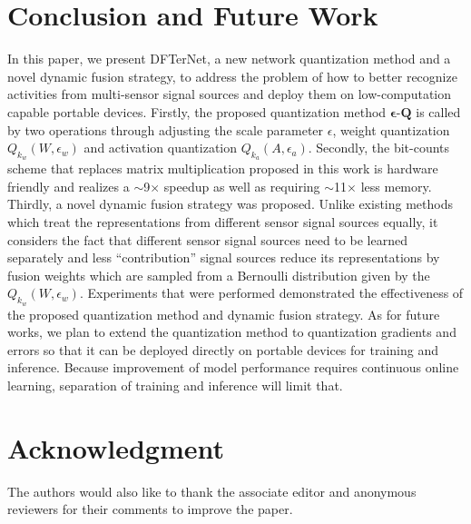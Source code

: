 \documentclass[twoside,twocolumn]{article}
\begin{document}
\section{Conclusion and Future Work}\label{sec:Conclusion_and_Future_Work}
In this paper, we present DFTerNet, a new network quantization method and a novel dynamic fusion strategy, to address the problem of how to better recognize activities from multi-sensor signal sources and deploy them on low-computation capable portable devices. Firstly, the proposed quantization method $\boldsymbol{\epsilon }$-$\boldsymbol{Q}$ is called by two operations through adjusting the scale parameter $\epsilon$, weight quantization $Q_{k_w}(W,\epsilon_w)$ and activation quantization $Q_{k_a}(A,\epsilon_a)$. Secondly, the bit-counts scheme that replaces matrix multiplication proposed in this work is hardware friendly and realizes a $\sim$9$\times$ speedup as well as requiring $\sim$11$\times$ less memory. Thirdly, a novel dynamic fusion strategy was proposed. Unlike existing methods which treat the representations from different sensor signal sources equally, it considers the fact that different sensor signal sources need to be learned separately and less ``contribution'' signal sources reduce its representations by fusion weights which are sampled from a Bernoulli distribution given by the $Q_{k_w}(W,\epsilon_w)$. Experiments that were performed demonstrated the effectiveness of the proposed quantization method and dynamic fusion strategy. As for future works, we plan to extend the quantization method to quantization gradients and errors so that it can be deployed directly on portable devices for training and inference. Because improvement of model performance requires continuous online learning, separation of training and inference will limit that.

\section*{Acknowledgment}

The authors would also like to thank the associate editor and anonymous reviewers for their comments to improve the paper.
\end{document}
